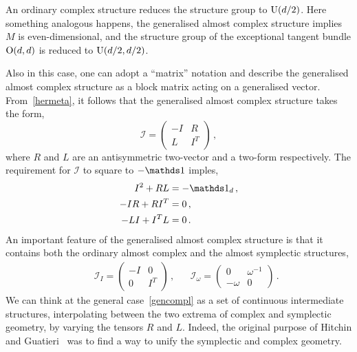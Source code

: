 \documentclass[debug]{phd}
\begin{document}
						An ordinary complex structure reduces the structure group to $\mathrm{U}(d/2)$. 
						Here something analogous happens, the generalised almost complex structure implies $M$ is even-dimensional, and the structure group of the exceptional tangent bundle $\mathrm{O}(d,d)$ is reduced to $\mathrm{U}(d/2, d/2)$. 
						
						Also in this case, one can adopt a ``matrix'' notation and describe the generalised almost complex structure as a block matrix acting on a generalised vector.
						From~\eqref{hermeta}, it follows that the generalised almost complex structure takes the form,
								\begin{equation}\label{gencompl}
									\mathcal{I} = \begin{pmatrix}
												- I	&	R \\
												L	& 	I^T
												\end{pmatrix} \, , 
								\end{equation}
						where $R$ and $L$ are an antisymmetric two-vector and a two-form respectively. 
						The requirement for $\mathcal{I}$ to square to $-\id$ imples,
								\begin{align}
									I^2 + RL &= -\id_d \, , \\
									-I R + R I^T &= 0 \, , \\
									-LI + I^T L &= 0 \, .
								\end{align}
						An important feature of the generalised almost complex structure is that it contains both the ordinary almost complex and the almost symplectic structures,
								\begin{align}
									&&	\mathcal{I}_I = \begin{pmatrix}
												- I	&	0 \\
												0	& 	I^T
												\end{pmatrix} \, ,	&&	\mathcal{I}_\omega = \begin{pmatrix}
												0		&	\omega^{-1} \\
												-\omega	& 	0
												\end{pmatrix} \, .
								\end{align}
						We can think at the general case~\eqref{gencompl} as a set of continuous intermediate structures, interpolating between the two extrema of complex and symplectic geometry, by varying the tensors $R$ and $L$.
						Indeed, the original purpose of Hitchin and Guatieri~\cite{HitchinLagrangian, gualtphd} was to find a way to unify the symplectic and complex geometry.
						
\end{document}
